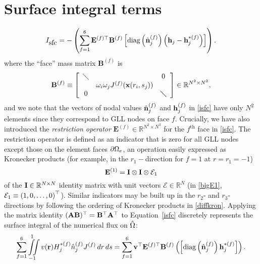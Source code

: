 \section{Surface integral terms}%
\begin{equation}
I_{\mbox{sfc}}=-\left(\sum_{f=1}^6
\mathbf{E}^{(f)\Txp}\mathbf{B}^{(f)}\left[\mbox{diag}\left(\bhn^{(f)}_j\right)\left(\bh_j-\bh^{\ast(f)}_j\right)\right]\right).
\label{isfc} %
\end{equation}
where the ``face'' mass matrix $\mathbf{B}^{(f)}$ is
\begin{equation}
\mathbf{B}^{(f)}\equiv \left[\begin{array}{ccc} \diagdown & & 0 \\ &  \omega_i\omega_j J^{(f)}(\mathbf{x}(r_i,s_j)) &  \\  0 & & \diagdown \end{array}\right]\in\mathbb{R}^{N^2 \times N^2},
\label{massA}
\end{equation}
and we note that the vectors of nodal values ${\hat {\bf n}}^{(f)}_j$ and ${\bf h}^{(f)}_j$ in
\ref{isfc} have only $N^2$ elements since they correspond to GLL nodes on face $f$.
Crucially, we have also introduced the \emph{restriction operator} $\mathbf{E}^{(f)}\in\mathbb{R}^{N^2\times N^3}$ for the $f^{\mbox{th}}$ face in \ref{isfc}.
The restriction operator is defined as an indicator that is zero for all GLL nodes except those on the
element faces $\partial \Omega_e$, an operation easily expressed as Kronecker products (for example, in the
$r_1-$direction for $f=1$ at $r=r_1=-1$)
\begin{equation}
{\bf E}^{(1)}={\bf I}\otimes {\bf I}\otimes \mathcal{E}_1
\label{bigE1}
\end{equation}
of the ${\bf I}\in\mathbb{R}^{N\times N}$ identity matrix with unit vectors $\mathcal{E}\in\mathbb{R}^N$
(in \ref{bigE1}, $\mathcal{E}_1\equiv\left(1,0,\dots, 0\right)^{\top}$).
Similar indicators may be built up in the $r_2$- and $r_3$-directions by following the ordering of
Kronecker products in \ref{diffkron}.
Applying the matrix identity $({\bf A}{\bf B})^{\top}={\bf B}^{\top}{\bf A}^{\top}$ to Equation~\ref{isfc} discretely represents the surface integral of the numerical flux on ${\hat \Omega}$:
\begin{equation}
\sum_{f=1}^6\iint\displaylimits_{-1}^1 v({\bf r}) H^{\ast(f)}_j\hat{n}^{(f)}_j J^{(f)}\, dr \, ds=\sum_{f=1}^6
{\bf v}^{\top}\mathbf{E}^{(f)\top}\mathbf{B}^{(f)}\left(\left[\mbox{diag}\left({\hat {\bf n}}^{(f)}_j\right){\bf h}^{\ast(f)}_j\right]\right).
\label{sfcintmatvect}
\end{equation}

